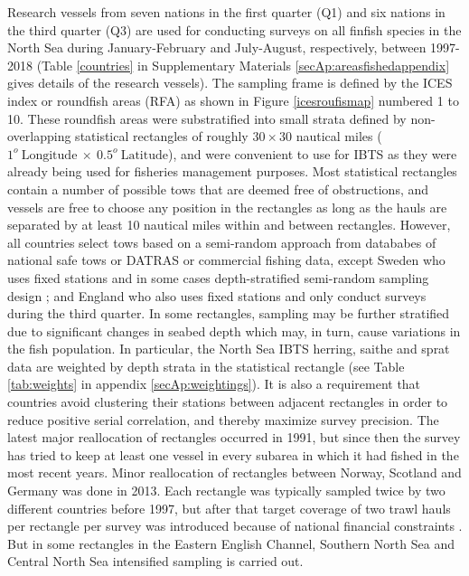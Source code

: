 \documentclass[a4paper 12pt]{article}
\numberwithin{equation}{section}
\begin{document}
Research vessels from seven nations in the first quarter (Q1) and six nations in the third quarter (Q3) are used for conducting surveys on all finfish species in the North Sea during January-February and July-August, respectively, between 1997-2018 (Table \ref{countries} in Supplementary Materials \ref{secAp:areasfishedappendix} gives details of the research vessels). The sampling frame is defined by the ICES index or roundfish areas (RFA) as shown in Figure \ref{icesroufismap} numbered 1 to 10. These  roundfish areas were substratified into small strata defined by non-overlapping statistical rectangles of roughly $30 \times 30$ nautical miles ($1^{o} \  \mathrm{Longitude} \ \times  \  0.5^{o} \ \mathrm{Latitude}$), and were convenient to use for IBTS as they were already being used for fisheries management purposes. Most statistical rectangles contain a number of possible tows that are deemed free of obstructions, and vessels are free to choose any position in the rectangles as long as the hauls are separated by at least 10 nautical miles within and between rectangles. However, all countries select tows based on a semi-random approach from datababes of national safe tows or DATRAS or commercial fishing data, except Sweden who uses fixed stations and in some cases depth-stratified semi-random sampling design \citep{ICES2018}; and England who also uses fixed stations and only conduct surveys during the third quarter. In some rectangles, sampling may be further stratified due to significant changes in seabed depth which may, in turn, cause variations in the fish population. In particular, the North Sea IBTS herring, saithe and sprat data are weighted by depth strata in the statistical rectangle (see Table \ref{tab:weights} in appendix \ref{secAp:weightings}). It is also a requirement that countries avoid clustering their stations between adjacent rectangles in order to reduce positive serial correlation, and thereby maximize survey precision.  The latest major reallocation of rectangles occurred in 1991, but since then the survey has tried to keep at least one vessel in every subarea in which it had fished in the most recent years. Minor reallocation of rectangles between Norway, Scotland and Germany was done in 2013. Each rectangle was  typically sampled twice by two different countries before 1997, but after that target coverage of two trawl hauls per rectangle per survey  was introduced because of national financial constraints \citep{ICES2015}. But in some rectangles in the Eastern English Channel, Southern North Sea and Central North Sea intensified sampling is carried out.\\
\end{document}
